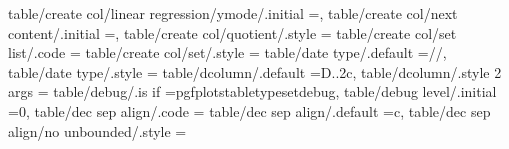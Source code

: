 {{{{{{{{{{{{{{{{{{{table/create col/linear regression/ymode/.initial                  =,%
table/create col/next content/.initial                             ={},                                                                                                                                
table/create col/quotient/.style                                   ={                                                                                                                                 
table/create col/set list/.code                                    ={                                                                                                                                 
table/create col/set/.style                                        ={                                                                                                                                 
table/date type/.default                                           ={\year/\month/\day},                                                                                                              
table/date type/.style                                             ={                                                                                                                                 
table/dcolumn/.default                                             ={D{.}{.}{2}}{c},                                                                                                                   
table/dcolumn/.style 2 args                                        ={                                                                                                                                 
table/debug/.is if                                                 =pgfplotstabletypesetdebug,                                                                                                         
table/debug level/.initial                                         =0,                                                                                                                                
table/dec sep align/.code                                          ={                                                                                                                                 
table/dec sep align/.default                                       =c,                                                                                                                                 
table/dec sep align/no unbounded/.style                            ={                                                                                                                                 
}}}}}}}}}}}}}}}}}}}}}}}}}}
